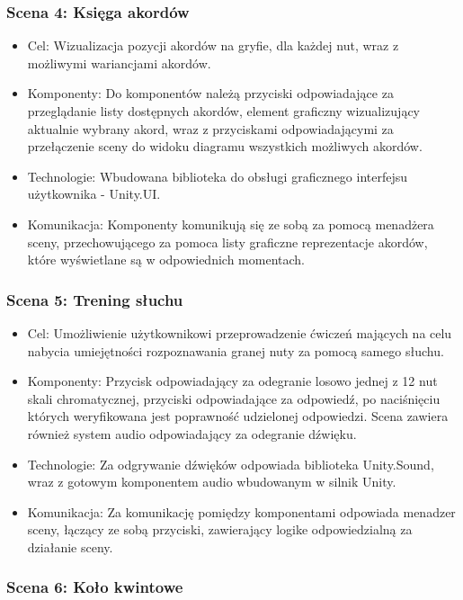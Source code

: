 \subsubsection{Scena 4: Księga akordów}

\begin{itemize}
\item Cel: Wizualizacja pozycji akordów na gryfie, dla każdej nut, wraz z możliwymi wariancjami akordów.
\item Komponenty: Do komponentów należą przyciski odpowiadające za przeglądanie listy dostępnych akordów, element graficzny wizualizujący aktualnie wybrany akord, wraz z przyciskami odpowiadającymi za przełączenie sceny do widoku diagramu wszystkich możliwych akordów.
\item Technologie: Wbudowana biblioteka do obsługi graficznego interfejsu użytkownika - Unity.UI.
\item Komunikacja: Komponenty komunikują się ze sobą za pomocą menadżera sceny, przechowującego za pomoca listy graficzne reprezentacje akordów, które wyświetlane są w odpowiednich momentach. 
\end{itemize}

\subsubsection{Scena 5: Trening słuchu}

\begin{itemize}
\item Cel: Umożliwienie użytkownikowi przeprowadzenie ćwiczeń mających na celu nabycia umiejętności rozpoznawania granej nuty za pomocą samego słuchu.
\item Komponenty: Przycisk odpowiadający za odegranie losowo jednej z 12 nut skali chromatycznej, przyciski odpowiadające za odpowiedź, po naciśnięciu których weryfikowana jest poprawność udzielonej odpowiedzi. Scena zawiera również system audio odpowiadający za odegranie dźwięku.
\item Technologie: Za odgrywanie dźwięków odpowiada biblioteka Unity.Sound, wraz z gotowym komponentem audio wbudowanym w silnik Unity.
\item Komunikacja: Za komunikację pomiędzy komponentami odpowiada menadzer sceny, łączący ze sobą przyciski, zawierający logike odpowiedzialną za działanie sceny.
\end{itemize}

\subsubsection{Scena 6: Koło kwintowe}

